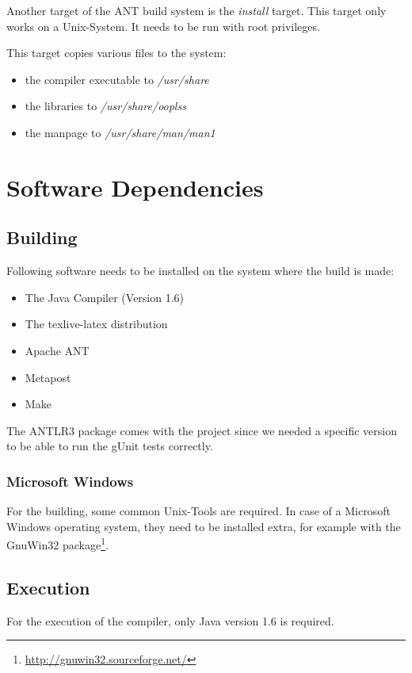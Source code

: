 Another target of the ANT build system is the \emph{install} target.
This target only works on a Unix-System. It needs to be run with root
privileges.

This target copies various files to the system:
\begin{itemize}
\item the compiler executable to \emph{/usr/share}
\item the libraries to \emph{/usr/share/ooplss}
\item the manpage to \emph{/usr/share/man/man1}
\end{itemize}

\section{Software Dependencies}

\subsection{Building}
Following software needs to be installed on the system where the 
build is made:

\begin{itemize}
\item The Java Compiler (Version 1.6)
\item The texlive-latex distribution
\item Apache ANT
\item Metapost
\item Make
\end{itemize}

The ANTLR3 package comes with the project since we needed a specific version
to be able to run the gUnit tests correctly.


\subsubsection{Microsoft Windows}

For the building, some common Unix-Tools are required. In case of a 
Microsoft Windows operating system, they need to be installed extra, for
example with the GnuWin32 package\footnote{\href{http://gnuwin32.sourceforge.net/}{http://gnuwin32.sourceforge.net/}}.

\subsection{Execution}

For the execution of the compiler, only Java version 1.6 is required.


